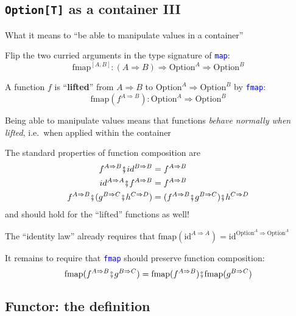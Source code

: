 \subsection{\texttt{Option{[}T{]}} as a container III}

What it means to ``be able to manipulate values in a container''

Flip the two curried arguments in the type signature of \texttt{\textcolor{blue}{\footnotesize{}map}}:{\footnotesize{}
\[
\text{fmap}^{[A,B]}:\left(A\Rightarrow B\right)\Rightarrow\text{Option}^{A}\Rightarrow\text{Option}^{B}
\]
}{\footnotesize\par}

A function $f$ is ``\textbf{lifted}'' from $A\Rightarrow B$ to
$\text{Option}^{A}\Rightarrow\text{Option}^{B}$ by \texttt{\textcolor{blue}{\footnotesize{}fmap}}:{\footnotesize{}
\[
\text{fmap}(f^{A\Rightarrow B}):\text{Option}^{A}\Rightarrow\text{Option}^{B}
\]
}{\footnotesize\par}

Being able to manipulate values means that functions \emph{behave
normally when lifted}, i.e.\ when applied within the container

The standard properties of function composition are{\footnotesize{}
\begin{align*}
f^{A\Rightarrow B}\bef id^{B\Rightarrow B} & =f^{A\Rightarrow B}\\
id^{A\Rightarrow A}\bef f^{A\Rightarrow B} & =f^{A\Rightarrow B}\\
f^{A\Rightarrow B}\bef(g^{B\Rightarrow C}\bef h^{C\Rightarrow D}) & =(f^{A\Rightarrow B}\bef g^{B\Rightarrow C})\bef h^{C\Rightarrow D}
\end{align*}
}and should hold for the ``lifted'' functions as well!

The ``identity law'' already requires that {\footnotesize{}$\text{fmap}(\text{id}^{A\Rightarrow A})=\text{id}^{\text{Option}^{A}\Rightarrow\text{Option}^{A}}$}{\footnotesize\par}

It remains to require that \texttt{\textcolor{blue}{\footnotesize{}fmap}}
should preserve function composition:{\footnotesize{}
\[
\text{fmap}(f^{A\Rightarrow B}\bef g^{B\Rightarrow C})=\text{fmap}(f^{A\Rightarrow B})\bef\text{fmap}(g^{B\Rightarrow C})
\]
}{\footnotesize\par}


\subsection{Functor: the definition}

